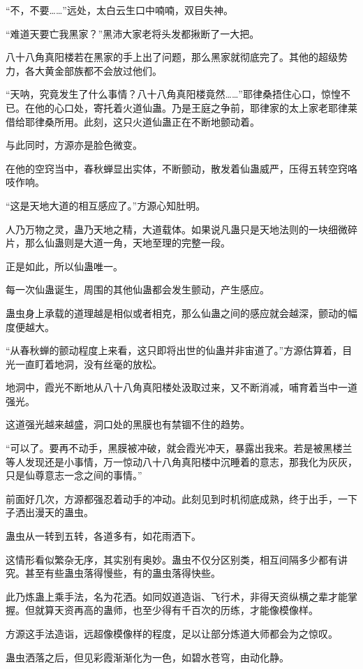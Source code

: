 \begin{this_body}
“不，不要……”远处，太白云生口中喃喃，双目失神。

“难道天要亡我黑家？”黑沛大家老将头发都揪断了一大把。

八十八角真阳楼若在黑家的手上出了问题，那么黑家就彻底完了。其他的超级势力，各大黄金部族都不会放过他们。

“天呐，究竟发生了什么事情？八十八角真阳楼竟然……”耶律桑捂住心口，惊惶不已。在他的心口处，寄托着火道仙蛊。乃是王庭之争前，耶律家的太上家老耶律莱借给耶律桑所用。此刻，这只火道仙蛊正在不断地颤动着。

与此同时，方源亦是脸色微变。

在他的空窍当中，春秋蝉显出实体，不断颤动，散发着仙蛊威严，压得五转空窍咯吱作响。

“这是天地大道的相互感应了。”方源心知肚明。

人乃万物之灵，蛊乃天地之精，大道载体。如果说凡蛊只是天地法则的一块细微碎片，那么仙蛊则是大道一角，天地至理的完整一段。

正是如此，所以仙蛊唯一。

每一次仙蛊诞生，周围的其他仙蛊都会发生颤动，产生感应。

蛊虫身上承载的道理越是相似或者相克，那么仙蛊之间的感应就会越深，颤动的幅度便越大。

“从春秋蝉的颤动程度上来看，这只即将出世的仙蛊并非宙道了。”方源估算着，目光一直盯着地洞，没有丝毫的放松。

地洞中，霞光不断地从八十八角真阳楼处汲取过来，又不断消减，哺育着当中一道强光。

这道强光越来越盛，洞口处的黑膜也有禁锢不住的趋势。

“可以了。要再不动手，黑膜被冲破，就会霞光冲天，暴露出我来。若是被黑楼兰等人发现还是小事情，万一惊动八十八角真阳楼中沉睡着的意志，那我化为灰灰，只是仙尊意志一念之间的事情。”

前面好几次，方源都强忍着动手的冲动。此刻见到时机彻底成熟，终于出手，一下子洒出漫天的蛊虫。

蛊虫从一转到五转，各道多有，如花雨洒下。

这情形看似繁杂无序，其实别有奥妙。蛊虫不仅分区别类，相互间隔多少都有讲究。甚至有些蛊虫落得慢些，有的蛊虫落得快些。

此乃炼蛊上乘手法，名为花洒。如同奴道造诣、飞行术，非得天资纵横之辈才能掌握。但就算天资再高的蛊师，也至少得有千百次的历练，才能像模像样。

方源这手法造诣，远超像模像样的程度，足以让部分炼道大师都会为之惊叹。

蛊虫洒落之后，但见彩霞渐渐化为一色，如碧水苍穹，由动化静。


\end{this_body}

